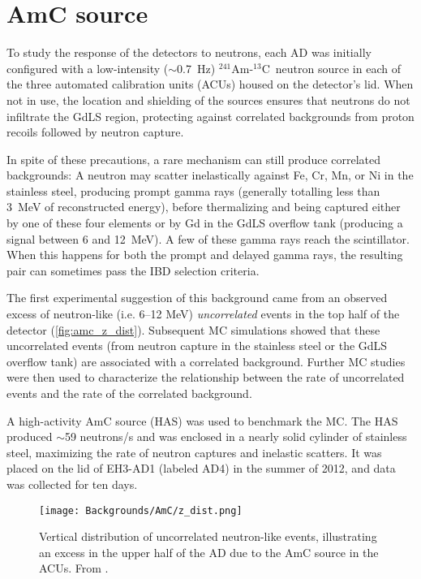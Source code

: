 \documentclass[../thesis.tex]{subfiles}
\begin{document}
\newcommand\AmC{$^{241}$Am-$^{13}$C}

\section{AmC source}
\label{sec:bkgAmC}

To study the response of the detectors to neutrons, each AD was initially configured with a low-intensity ($\sim$0.7~Hz) \AmC\ neutron source in each of the three automated calibration units (ACUs) housed on the detector's lid. When not in use, the location and shielding of the sources ensures that neutrons do not infiltrate the GdLS region, protecting against correlated backgrounds from proton recoils followed by neutron capture.

In spite of these precautions, a rare mechanism can still produce correlated backgrounds: A neutron may scatter inelastically against Fe, Cr, Mn, or Ni in the stainless steel, producing prompt gamma rays (generally totalling less than 3~MeV of reconstructed energy), before thermalizing and being captured either by one of these four elements or by Gd in the GdLS overflow tank (producing a signal between 6 and 12~MeV). A few of these gamma rays reach the scintillator. When this happens for both the prompt and delayed gamma rays, the resulting pair can sometimes pass the IBD selection criteria.

The first experimental suggestion of this background came from an observed excess of neutron-like (i.e. 6--12 MeV) \emph{uncorrelated} events in the top half of the detector (\autoref{fig:amc_z_dist}). Subsequent MC simulations showed that these uncorrelated events (from neutron capture in the stainless steel or the GdLS overflow tank) are associated with a correlated background. Further MC studies were then used to characterize the relationship between the rate of uncorrelated events and the rate of the correlated background.

A high-activity AmC source (HAS) was used to benchmark the MC. The HAS produced $\sim$59 neutrons/s and was enclosed in a nearly solid cylinder of stainless steel, maximizing the rate of neutron captures and inelastic scatters. It was placed on the lid of EH3-AD1 (labeled AD4) in the summer of 2012, and data was collected for ten days.

\begin{figure}[ht]
  \texttt{[image: Backgrounds/AmC/z\_dist.png]}
  \caption{Vertical distribution of uncorrelated neutron-like events, illustrating an excess in the upper half of the AD due to the AmC source in the ACUs. From \cite{Gu_2016}.}
  \label{fig:amc_z_dist}
\end{figure}
\end{document}
